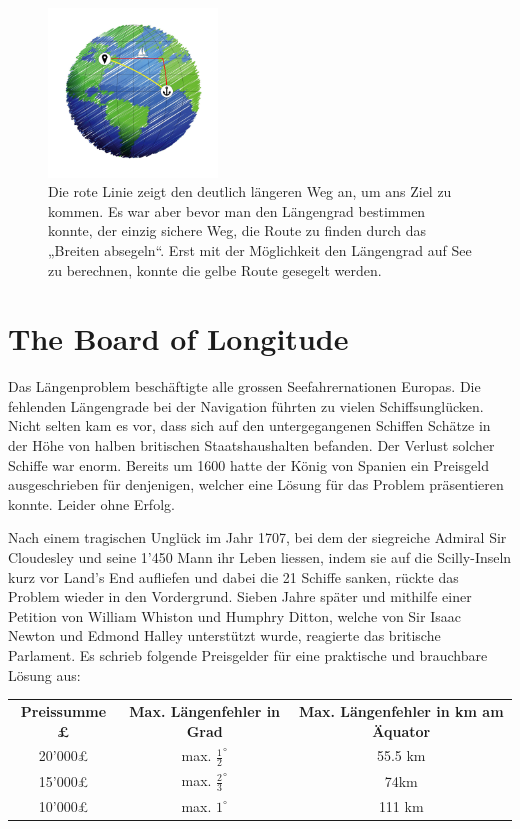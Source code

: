 \begin{refsection}
\begin{figure}[htbp]
\centering
\includegraphics[width=0.4\textwidth]{kugel/Breitensegeln.jpg}
\caption{Die rote Linie zeigt den deutlich längeren Weg an, um ans Ziel zu kommen. Es war aber bevor man den Längengrad bestimmen konnte, der einzig sichere Weg, die Route zu finden durch das „Breiten absegeln“. Erst mit der Möglichkeit den Längengrad auf See zu berechnen, konnte die gelbe Route gesegelt werden.}
\end{figure}


\section{The Board of Longitude}
Das Längenproblem beschäftigte alle grossen Seefahrernationen Europas. Die fehlenden Längengrade bei der Navigation führten zu vielen Schiffsunglücken. Nicht selten kam es vor, dass sich auf den untergegangenen Schiffen Schätze in der Höhe von halben britischen Staatshaushalten befanden. Der Verlust solcher Schiffe war enorm.
Bereits um 1600 hatte der König von Spanien ein Preisgeld ausgeschrieben für denjenigen, welcher eine Lösung für das Problem präsentieren konnte. Leider ohne Erfolg.

Nach einem tragischen Unglück im Jahr 1707, bei dem der siegreiche Admiral Sir Cloudesley und seine 1’450 Mann ihr Leben liessen, indem sie auf die Scilly-Inseln kurz vor Land’s End aufliefen und dabei die 21 Schiffe sanken, rückte das Problem wieder in den Vordergrund.
Sieben Jahre später und mithilfe einer Petition von William Whiston und Humphry Ditton, welche von Sir Isaac Newton und Edmond Halley unterstützt wurde, reagierte das britische Parlament.
Es schrieb folgende Preisgelder für eine praktische und brauchbare Lösung aus:
\begin{center}
\renewcommand{\arraystretch}{1.5}
\begin{tabular}{ccc}
\textbf{Preissumme £} & \textbf{Max. Längenfehler in Grad} & \textbf{Max. Längenfehler in km am Äquator}  \\
20’000£ & max. $\frac{1}{2}^{\circ}$ & 55.5 km \\
15’000£ & max. $\frac{2}{3}^{\circ}$ & 74km \\
10’000£ & max. $1 ^{\circ}$ & 111 km 
\end{tabular}
\end{center}


\end{refsection}
